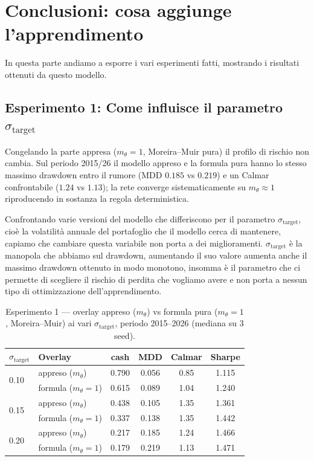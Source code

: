 \section{Conclusioni: cosa aggiunge l'apprendimento}
\label{sec:conclusioni-finale}
In questa parte andiamo a esporre i vari esperimenti fatti, mostrando i risultati ottenuti da questo modello. 

\subsection{Esperimento 1: Come influisce il parametro \texorpdfstring{$\sigma_{\mathrm{target}}$}{sigma target}} 
Congelando la parte appresa ($m_\theta=1$, Moreira--Muir pura) il profilo di
rischio non cambia. Sul periodo 2015/26 il modello appreso e la formula pura hanno
lo stesso massimo drawdown entro il rumore (MDD $0.185$ vs $0.219$) e un
Calmar confrontabile ($1.24$ vs $1.13$); la rete converge sistematicamente su
$m_\theta\approx 1$ riproducendo in sostanza la regola deterministica. 

Confrontando varie versioni del modello che differiscono per il parametro $\sigma_{\mathrm{target}}$, cioè la volatilità annuale del portafoglio che
il modello cerca di mantenere, capiamo che cambiare questa variabile non porta a dei miglioramenti. 
$\sigma_{\mathrm{target}}$ è la manopola che abbiamo sul drawdown, aumentando il suo valore aumenta anche il massimo drawdown ottenuto in modo monotono, 
insomma è il parametro che ci permette di scegliere il rischio di perdita che vogliamo avere e non porta a nessun tipo di ottimizzazione dell'apprendimento.

\begin{table}[H]
\centering
\small
\caption{Esperimento 1 --- overlay appreso ($m_\theta$) vs formula
pura ($m_\theta{=}1$, Moreira--Muir) ai vari $\sigma_{\mathrm{target}}$, periodo
2015--2026 (mediana su 3 seed).}
\label{tab:exp1-mm-sweep}
\begin{tabular}{llcccc}
\toprule
$\sigma_{\mathrm{target}}$ & Overlay & cash & MDD & Calmar & Sharpe \\
\midrule
\multirow{2}{*}{0.10}
 & appreso ($m_\theta$)     & 0.790 & 0.056 & 0.85 & 1.115 \\
 & formula ($m_\theta{=}1$) & 0.615 & 0.089 & 1.04 & 1.240 \\
\midrule
\multirow{2}{*}{0.15}
 & appreso ($m_\theta$)     & 0.438 & 0.105 & 1.35 & 1.361 \\
 & formula ($m_\theta{=}1$) & 0.337 & 0.138 & 1.35 & 1.442 \\
\midrule
\multirow{2}{*}{0.20}
 & appreso ($m_\theta$)     & 0.217 & 0.185 & 1.24 & 1.466 \\
 & formula ($m_\theta{=}1$) & 0.179 & 0.219 & 1.13 & 1.471 \\
\bottomrule
\end{tabular}
\end{table}


